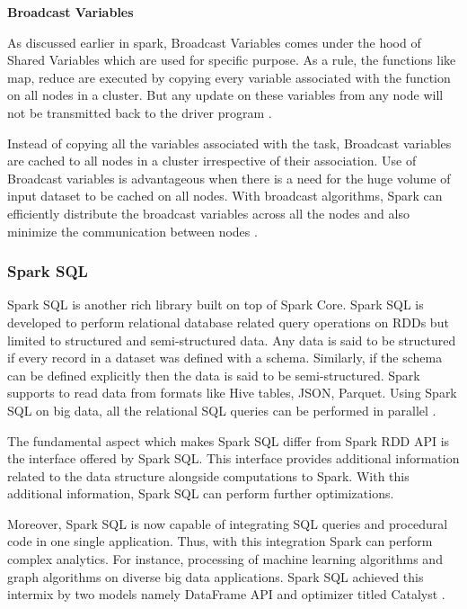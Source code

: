 \textbf{Broadcast Variables} 
\par As discussed earlier in spark, Broadcast Variables comes under the hood of Shared Variables which are used for specific purpose. As a rule, the functions like map, reduce are executed by copying every variable associated with the function on all nodes in a cluster. But any update on these variables from any node will not be transmitted back to the driver program \cite{spark:website}.

\par Instead of copying all the variables associated with the task, Broadcast variables are cached to all nodes in a cluster irrespective of their association. Use of Broadcast variables is advantageous when there is a need for the huge volume of input dataset to be cached on all nodes. With broadcast algorithms, Spark can efficiently distribute the broadcast variables across all the nodes and also minimize the communication between nodes \cite{spark:website}.

\subsubsection{Spark SQL}

\par Spark SQL is another rich library built on top of Spark Core. Spark SQL is developed to perform relational database related query operations on RDDs but limited to structured and semi-structured data. Any data is said to be structured if every record in a dataset was defined with a schema. Similarly, if the schema can be defined explicitly then the data is said to be semi-structured. Spark supports to read data from formats like Hive tables, JSON, Parquet. Using Spark SQL on big data, all the relational SQL queries can be performed in parallel \cite{spark:website}. 

\par The fundamental aspect which makes Spark SQL differ from Spark RDD API is the interface offered by Spark SQL. This interface provides additional information related to the data structure alongside computations to Spark. With this additional information, Spark SQL can perform further optimizations.


\par Moreover, Spark SQL is now capable of integrating SQL queries and procedural code in one single application. Thus, with this integration Spark can perform complex analytics. For instance, processing of machine learning algorithms and graph algorithms on diverse big data applications. Spark SQL achieved this intermix by two models namely DataFrame API and optimizer titled Catalyst \cite{armbrust2015spark}.

